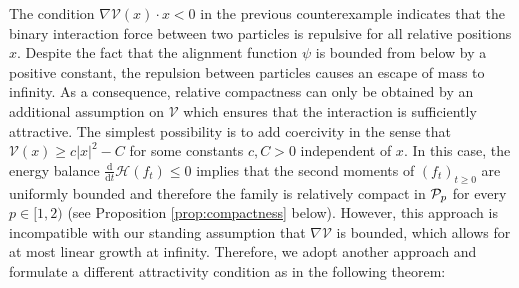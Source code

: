 \documentclass[11pt]{article}
\newcommand{\dx}[1]{\frac{\mathrm{d}}{\mathrm{d}#1}}
\newcommand{\abs}[1]{\left| #1 \right|}
\newcommand{\Pp}[1]{
    \ifx #1\infty
        \mathcal{P}_{c}
    \else 
        \mathcal{P}_{#1}
    \fi 
}
\begin{document}
\begin{bibunit}[unsrtnat]
The condition $\nabla \mathcal{V}(x) \cdot x < 0$ in the previous counterexample indicates that the binary interaction force between two particles is repulsive for all relative positions $x$. Despite the fact that the alignment function $\psi$ is bounded from below by a positive constant, the repulsion between particles causes an escape of mass to infinity. As a consequence, relative compactness can only be obtained by an additional assumption on $\mathcal{V}$ which ensures that the interaction is sufficiently attractive. The simplest possibility is to add coercivity in the sense that $\mathcal{V}(x) \geq c \abs{x}^2 - C$ for some constants $c,C > 0$ independent of $x$. In this case, the energy balance $\dx{t} \mathcal{H}(f_t) \leq 0$ implies that the second moments of $(f_t)_{t \geq 0}$ are uniformly bounded and therefore the family is relatively compact in $\Pp{p}$ for every $p \in [1,2)$ (see Proposition \ref{prop:compactness} below). However, this approach is incompatible with our standing assumption that $\nabla \mathcal{V}$ is bounded, which allows for at most linear growth at infinity. Therefore, we adopt another approach and formulate a different attractivity condition as in the following theorem:


\end{bibunit}
\end{document}
